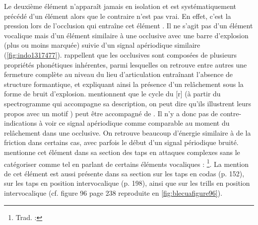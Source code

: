 Le deuxième élément  n'apparaît jamais en isolation et est systématiquement précédé d'un élément  alors que le contraire n'est pas vrai. En effet, c'est la pression lors de l'occlusion qui entraîne cet élément . Il ne s'agit pas d'un élément vocalique mais d'un élément similaire à une occlusive avec une barre d'explosion (plus ou moins marquée) suivie d'un signal apériodique similaire (\autoref{fig:indo1317477}). \textcite[28]{skarnitzlPrinciplesPhoneticSegmentation2011} rappellent que les occlusives sont composées de plusieurs propriétés phonétiques inhérentes, parmi lesquelles on retrouve entre autres une fermeture complète au niveau du lieu d'articulation entraînant l'absence de structure formantique, et expliquant ainsi la présence d'un relâchement sous la forme de bruit d'explosion. \textcite[72]{skarnitzlPrinciplesPhoneticSegmentation2011} mentionnent que le cycle du [r] (à partir du spectrogramme qui accompagne sa description, on peut dire qu'ils illustrent leurs propos avec un motif ) peut être accompagné de .
Il n'y a donc pas de contre-indications à voir ce signal apériodique comme comparable au moment du relâchement dans une occlusive. On retrouve beaucoup d'énergie similaire à de la friction dans certains cas, avec parfois le début d'un signal périodique bruité.\\

\textcite[87]{blecuaVibrantesEspanolManifestaciones2002} mentionne cet élément dans sa section des taps en attaques complexes sans le catégoriser comme tel en parlant de certains éléments vocaliques : \footnote{Trad. : }. La mention de cet élément est aussi présente dans sa section sur les taps en codas (p. 152), sur les taps en position intervocalique (p. 198), ainsi que sur les trills en position intervocalique (cf. figure 96 page 238 reproduite en \autoref{fig:blecuafigure96}).\\

